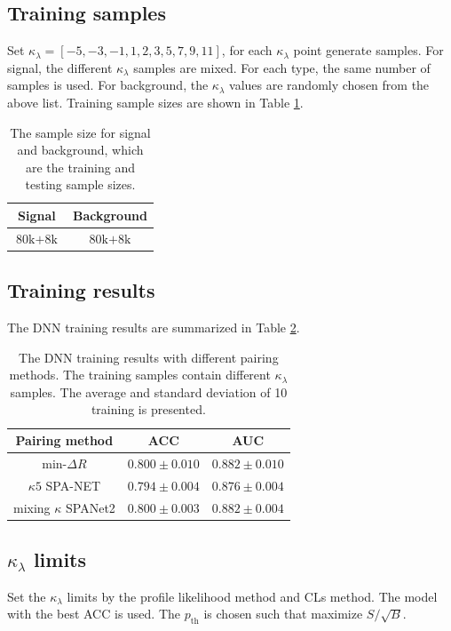 \documentclass[12pt]{article}
\begin{document}
	\subsection{Training samples}%
	\label{sub:training_samples2}
	Set $\kappa_\lambda = [-5, -3, -1, 1, 2, 3, 5, 7, 9, 11]$, for each $\kappa_\lambda$ point generate samples. For signal, the different $\kappa_\lambda$ samples are mixed. For each type, the same number of samples is used. For background, the $\kappa_\lambda$ values are randomly chosen from the above list. Training sample sizes are shown in Table \ref{tab:DNN_sample_size3}.
		\begin{table}[htpb]
			\centering
			\caption{The sample size for signal and background, which are the training and testing sample sizes.}
			\label{tab:DNN_sample_size3}
			\begin{tabular}{c|c}
			 Signal & Background\\ \hline
			 $\text{80k} + \text{8k}$      &$\text{80k} + \text{8k}$ 
			\end{tabular}
		\end{table}

	\subsection{Training results}%
	\label{sub:training_results}
		The DNN training results are summarized in Table \ref{tab:DNN_results}.
		\begin{table}[htpb]
			\centering
			\caption{The DNN training results with different pairing methods. The training samples contain different $\kappa_\lambda$ samples. The average and standard deviation of 10 training is presented.}
			\label{tab:DNN_results}
			\begin{tabular}{c|cc}
			Pairing method        & ACC     & AUC   \\ \hline
			$\text{min-}\Delta R$ & $0.800 \pm 0.010$ & $0.882 \pm 0.010$ \\
			$\kappa 5$ SPA-NET    & $0.794 \pm 0.004$ & $0.876 \pm 0.004$ \\
			mixing $\kappa$ SPANet2 & $0.800 \pm 0.003$ & $0.882 \pm 0.004$ \\
			\end{tabular}      
		\end{table}
	
	\subsection{\texorpdfstring{$\kappa_\lambda$}{kappa} limits}%
	\label{sub:kappa_limits}
		Set the $\kappa_\lambda$ limits by the profile likelihood method and CLs method. The model with the best ACC is used. The $p_\text{th}$ is chosen such that maximize $S / \sqrt{B}$.
\end{document}
